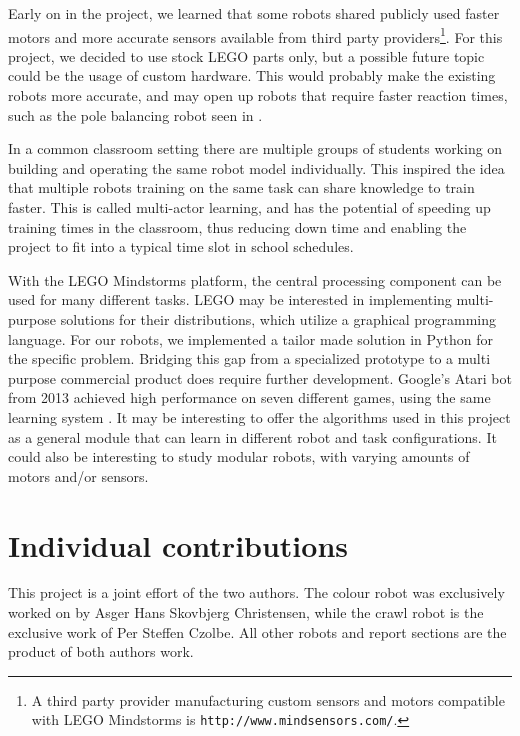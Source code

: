 \documentclass[11pt, a4paper]{article}
\begin{document}
	Early on in the project, we learned that some robots shared publicly used faster motors and more accurate sensors available from third party providers\footnote{A third party provider manufacturing custom sensors and motors compatible with LEGO Mindstorms is \texttt{http://www.mindsensors.com/}.}. For this project, we decided to use stock LEGO parts only, but a possible future topic could be the usage of custom hardware. This would probably make the existing robots more accurate, and may open up robots that require faster reaction times, such as the pole balancing robot seen in \cite{youtube_pole}.
	
	In a common classroom setting there are multiple groups of students working on building and operating the same robot model individually. This inspired the idea that multiple robots training on the same task can share knowledge to train faster. This is called multi-actor learning, and has the potential of speeding up training times in the classroom, thus reducing down time and enabling the project to fit into a typical time slot in school schedules.
	
	With the LEGO Mindstorms platform, the central processing component can be used for many different tasks. LEGO may be interested in implementing multi-purpose solutions for their distributions, which utilize a graphical programming language. For our robots, we implemented a tailor made solution in Python for the specific problem. Bridging this gap from a specialized prototype to a multi purpose commercial product does require further development. Google's Atari bot from 2013 achieved high performance on seven different games, using the same learning system \cite{google_deepmind_atari}. It may be interesting to offer the algorithms used in this project as a general module that can learn in different robot and task configurations. It could also be interesting to study modular robots, with varying amounts of motors and/or sensors.
	
	
	\section{Individual contributions}
	This project is a joint effort of the two authors. The colour robot was exclusively worked on by Asger Hans Skovbjerg Christensen, while the crawl robot is the exclusive work of Per Steffen Czolbe. All other robots and report sections are the product of both authors work.
	
	
	
	
	
\end{document}
